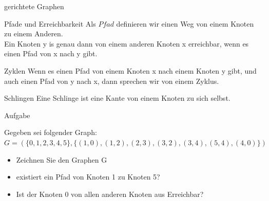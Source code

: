 	
	\begin{frame}{gerichtete Graphen}
		\begin{block}{Pfade und Erreichbarkeit}
			Als $Pfad$ definieren wir einen Weg von einem Knoten zu einem Anderen.\\
			\vspace{5pt}
			Ein Knoten y is genau dann von einem anderen Knoten x erreichbar, 
			wenn es einen Pfad von x nach y gibt.
		\end{block}
		
		\pause
		\begin{block}{Zyklen}
			Wenn es einen Pfad von einem Knoten x nach einem Knoten y gibt, und auch einen Pfad von y nach x, dann sprechen wir von einem Zyklus.
		\end{block}
		
		\pause
		\begin{block}{Schlingen}
			Eine Schlinge ist eine Kante von einem Knoten zu sich selbst.
		\end{block}
	\end{frame}
	
	
	\begin{frame}{Aufgabe}
		\begin{block}{}
			Gegeben sei folgender Graph:\\
			$G=(\{0,1,2,3,4,5\}, \{(1,0), (1,2), (2,3), (3,2), (3,4), (5,4), (4,0)\})$\\
			\vspace{10pt}
			\begin{itemize}
				\pause
				\item Zeichnen Sie den Graphen G
				
				\pause
				\item existiert ein Pfad von Knoten 1 zu Knoten 5?
				
				\pause
				\item Ist der Knoten 0 von allen anderen Knoten aus Erreichbar?
			\end{itemize}
		\end{block}
	\end{frame}
	
	


